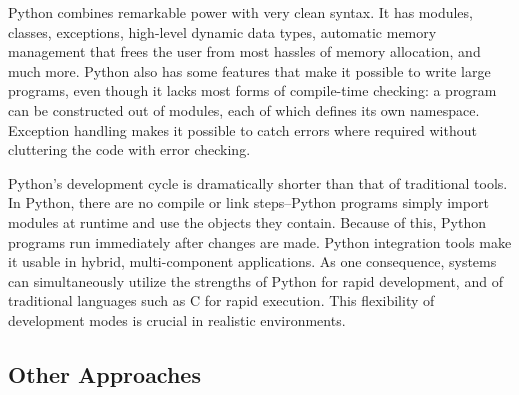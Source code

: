 \documentclass[10pt,relax]{SANDreport}
\begin{document}
Python combines remarkable power with very clean syntax. It has
modules, classes, exceptions, high-level dynamic data types, automatic
memory management that frees the user from most hassles of memory
allocation, and much more. Python also has some features that make it
possible to write large programs, even though it lacks most forms of
compile-time checking: a program can be constructed out of modules,
each of which defines its own namespace. Exception handling makes it
possible to catch errors where required without cluttering the code
with error checking.

Python's development cycle is dramatically shorter than that of
traditional tools. In Python, there are no compile or link
steps--Python programs simply import modules at runtime and use the
objects they contain. Because of this, Python programs run
immediately after changes are made. Python integration tools make it
usable in hybrid, multi-component applications. As one consequence,
systems can simultaneously utilize the strengths of Python for rapid
development, and of traditional languages such as C for rapid
execution.  This flexibility of development modes is crucial in
realistic environments.

\subsection{Other Approaches}
\end{document}
